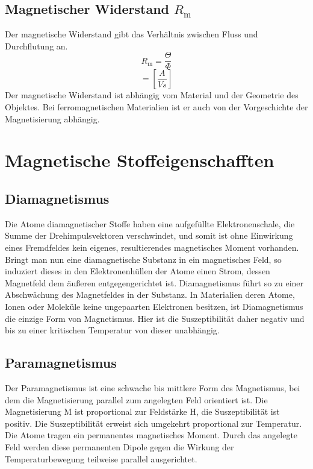 \documentclass[a4paper,twoside,12pt,DIV=13,BCOR=5mm,numbers=noenddot,cleardoublepage=empty]{scrbook}
\begin{document}
        \subsection{Magnetischer Widerstand $R_\mathrm{m}$}
    Der magnetische Widerstand gibt das Verh\"altnis zwischen Fluss und 
    Durchflutung an.
    \begin{equation}
        R_\mathrm{m}=\frac{\Theta}{\Phi}
    \end{equation}
    \begin{equation}
        [R_\mathrm{m}]=[\frac{A}{Vs}]
    \end{equation}
    Der magnetische Widerstand ist abh\"angig vom Material und der Geometrie 
    des Objektes. Bei ferromagnetischen Materialien ist er auch von der 
    Vorgeschichte der Magnetisierung abh\"angig.
    \section{Magnetische Stoffeigenschafften}
        \subsection{Diamagnetismus}
        Die Atome diamagnetischer Stoffe haben eine aufgef\"ullte 
        Elektronenschale, die Summe der Drehimpulsvektoren verschwindet, und 
        somit ist ohne Einwirkung eines Fremdfeldes kein eigenes, 
        resultierendes magnetisches Moment vorhanden. Bringt man nun eine 
        diamagnetische Substanz in ein magnetisches Feld, so induziert dieses 
        in den Elektronenh\"ullen der Atome einen Strom, dessen Magnetfeld dem 
        \"au\ss{}eren entgegengerichtet ist. Diamagnetismus f\"uhrt so zu einer 
        Abschw\"achung des Magnetfeldes in der Substanz. In Materialien deren 
        Atome, Ionen oder Molek\"ule keine ungepaarten Elektronen besitzen, ist 
        Diamagnetismus die einzige Form von Magnetismus. Hier ist die 
        Suszeptibilit\"at daher negativ und bis zu einer kritischen Temperatur 
        von dieser unabh\"angig. 
        \subsection{Paramagnetismus}
        Der Paramagnetismus ist eine schwache bis mittlere Form des 
        Magnetismus, bei dem die Magnetisierung parallel zum angelegten Feld 
        orientiert ist. Die Magnetisierung M ist proportional zur Feldst\"arke H, 
        die Suszeptibilit\"at ist positiv. Die Suszeptibilit\"at erweist sich 
        umgekehrt proportional zur Temperatur. Die Atome tragen ein permanentes 
        magnetisches Moment. Durch das angelegte Feld werden diese permanenten 
        Dipole gegen die Wirkung der Temperaturbewegung teilweise parallel 
        ausgerichtet.
\end{document}
